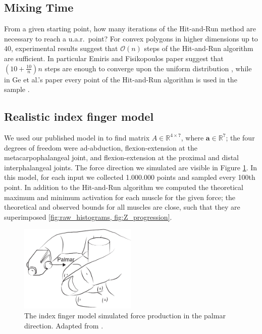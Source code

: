 \subsection{Mixing Time}
\label{sec_lengthrun}
From a given starting point, how many iterations of the Hit-and-Run method are necessary to reach a u.a.r.\ point? For convex polygons in higher dimensions up to $40$, experimental results suggest that $\mathcal{O}(n)$ steps of the Hit-and-Run algorithm are sufficient.
In particular Emiris and Fisikopoulos paper suggest that $(10 + \frac{10}{n})n$ steps are enough to converge upon the uniform distribution \cite{emiris2013efficient}, while in Ge et al.'s paper every point of the Hit-and-Run algorithm is used in the sample \cite{Ge}. 


\subsection{Realistic index finger model}
\label{ss:finger}
We used our published model in \cite{Valero-Cuevas1998Large} to find matrix $A \in \mathbb{R}^{4 \times 7}$, where $\textbf{a} \in \mathbb{R}^7$; the four degrees of freedom were ad-abduction, flexion-extension at the metacarpophalangeal joint, and flexion-extension at the proximal and distal interphalangeal joints.
The force direction we simulated are visible in Figure \ref{fig:finger}.
In this model, for each input we collected 1.000.000 points and sampled every 100th point.
In addition to the Hit-and-Run algorithm we computed the theoretical maximum and minimum activation for each muscle for the given force; the theoretical and observed bounds for all muscles are close, such that they are superimposed \ref{fig:raw_histograms, fig:Z_progression}.

\begin{figure}[htbp]
  \centering
  \includegraphics[width=0.5\textwidth]{sections/figs/finger.pdf}
  \caption{The index finger model simulated force production in the palmar direction. Adapted from \cite{Valero-Cuevas1998Large}.}
  \label{fig:finger}
\end{figure}


